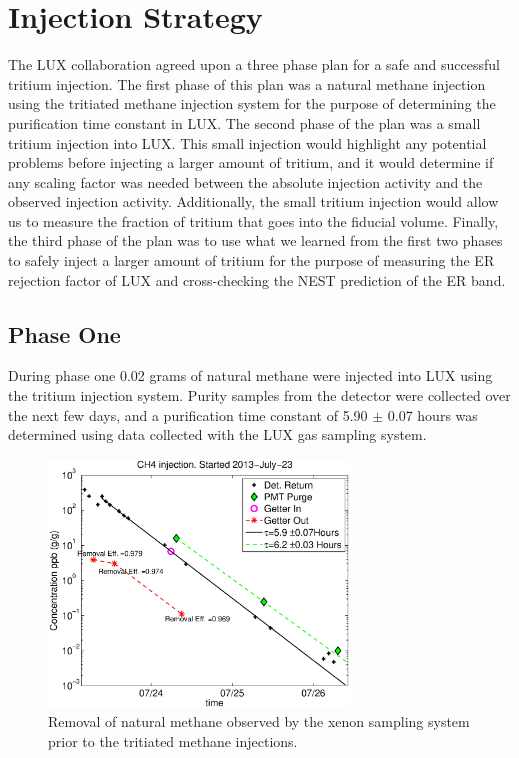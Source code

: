 \section{Injection Strategy}

The LUX collaboration agreed upon a three phase plan for a safe and successful tritium injection.  The first phase of this plan was a natural methane injection using the tritiated methane injection system for the purpose of determining the purification time constant in LUX.  The second phase of the plan was a small tritium injection into LUX.  This small injection would highlight any potential problems before injecting a larger amount of tritium, and it would determine if any scaling factor was needed between the absolute injection activity and the observed injection activity.  Additionally, the small tritium injection would allow us to measure the fraction of tritium that goes into the fiducial volume.  Finally, the third phase of the plan was to use what we learned from the first two phases to safely inject a larger amount of tritium for the purpose of measuring the ER rejection factor of LUX and cross-checking the NEST prediction of the ER band.

\subsection{Phase One}

During phase one 0.02 grams of natural methane were injected into LUX using the tritium injection system.  Purity samples from the detector were collected over the next few days, and a purification time constant of 5.90 $\pm$ 0.07 hours was determined using data collected with the LUX gas sampling system.

\begin{figure}[H]\centering
\includegraphics[width=80mm]{CH4_injection.eps}
\caption{Removal of natural methane observed by the xenon sampling system prior to the tritiated methane injections. }
\label{fig:Removal}
\end{figure}



